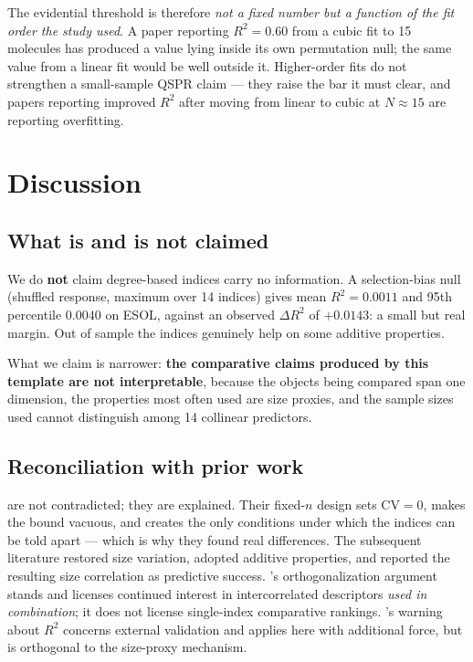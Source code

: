 \documentclass[11pt,a4paper]{article}
\theoremstyle{plain}
\newcommand{\CV}{\mathrm{CV}}
\begin{document}
The evidential threshold is therefore \emph{not a fixed number but a function of the fit
order the study used}. A paper reporting $R^2=0.60$ from a cubic fit to 15 molecules has
produced a value lying inside its own permutation null; the same value from a linear fit
would be well outside it. Higher-order fits do not strengthen a small-sample QSPR claim
--- they raise the bar it must clear, and papers reporting improved $R^2$ after moving
from linear to cubic at $N\approx15$ are reporting overfitting.

\section{Discussion}

\subsection{What is and is not claimed}

We do \textbf{not} claim degree-based indices carry no information. A selection-bias null
(shuffled response, maximum over 14 indices) gives mean $R^2=0.0011$ and 95th percentile
$0.0040$ on ESOL, against an observed $\Delta R^2$ of $+0.0143$: a small but real margin.
Out of sample the indices genuinely help on some additive properties.

What we claim is narrower: \textbf{the comparative claims produced by this template are
not interpretable}, because the objects being compared span one dimension, the properties
most often used are size proxies, and the sample sizes used cannot distinguish among 14
collinear predictors.

\subsection{Reconciliation with prior work}

\citet{gutman2013} are not contradicted; they are explained. Their fixed-$n$ design sets
$\CV=0$, makes the bound vacuous, and creates the only conditions under which the indices
can be told apart --- which is why they found real differences. The subsequent literature
restored size variation, adopted additive properties, and reported the resulting size
correlation as predictive success. \citet{randic1994}'s orthogonalization argument stands
and licenses continued interest in intercorrelated descriptors \emph{used in combination};
it does not license single-index comparative rankings. \citet{roy2014}'s warning about
$R^2$ concerns external validation and applies here with additional force, but is
orthogonal to the size-proxy mechanism.
\end{document}
